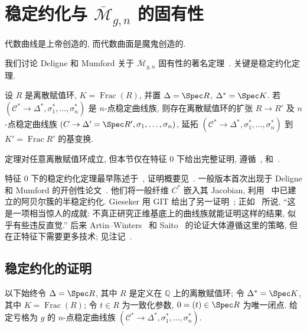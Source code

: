 \section{\texorpdfstring{稳定约化与 $\overline{\mathcal M}_{g,\allowbreak n}$ 的固有性}{稳定约化与 稳定曲线模叠 的固有性}}\label{src:6.5}
\begin{epigraph}
代数曲线是上帝创造的, 而代数曲面是魔鬼创造的.
\end{epigraph}
我们讨论 Deligne 和 Mumford 关于 $\overline{\mathcal M}_{g,\allowbreak n}$ 固有性的著名定理~\cite{DM69}. 关键是稳定约化定理.
\begin{theorem}[稳定约化]\label{src:6.5.1}
设 $R$ 是离散赋值环, $K=\operatorname{Frac}(R)$, 并置 $\Delta=\Spec R$, $\Delta^*=\Spec K$. 若 $(\mathcal C^*\to\Delta^*,\allowbreak \sigma_1^*,\allowbreak \ldots,\allowbreak \sigma_n^*)$ 是 $n$-点稳定曲线族, 则存在离散赋值环的扩张 $R\to\allowbreak R'$ 及 $n$-点稳定曲线族 $(\mathcal C\to\Delta'=\Spec R',\allowbreak \sigma_1,\allowbreak \ldots,\allowbreak \sigma_n)$, 延拓 $(\mathcal C^*\to\Delta^*,\allowbreak \sigma_1^*,\allowbreak \ldots,\allowbreak \sigma_n^*)$ 到 $K'=\operatorname{Frac}R'$ 的基变换.
\end{theorem}
定理对任意离散赋值环成立, 但本节仅在特征 $0$ 下给出完整证明, 遵循~\cite[第 II 章]{KKMS73}, \cite[\S3.C]{HM98} 和~\cite[\S X.4]{ACG11}.
\begin{remark}\label{src:6.5.2}
特征 $0$ 下的稳定约化定理最早陈述于~\cite[引理 A]{MM64b}, 证明概要见~\cite{May69}. 一般版本首次出现于 Deligne 和 Mumford 的开创性论文~\cite{DM69}. 他们将一般纤维 $C^*$ 嵌入其 Jacobian, 利用~\cite{SGA7-I,SGA7-II} 中已建立的阿贝尔簇的半稳定约化. Gieseker 用 GIT 给出了另一证明~\cite{Gie82}; 正如~\cite[Tag 0C2Q]{SP} 所说, ``这是一项相当惊人的成就: 不真正研究正维基底上的曲线族就能证明这样的结果, 似乎有些违反直觉.'' 后来 Artin--Winters~\cite{AW71} 和 Saito~\cite{Sai87} 的论证大体遵循这里的策略, 但在正特征下需要更多技术; 见注记~.
\end{remark}
\subsection{稳定约化的证明}\label{src:6.5.1-subsection}
以下始终令 $\Delta=\Spec R$, 其中 $R$ 是定义在 $\mathbb Q$ 上的离散赋值环; 令 $\Delta^*=\Spec K$, 其中 $K=\operatorname{Frac}(R)$; 令 $t\in R$ 为一致化参数, $0=(t)\in\Spec R$ 为唯一闭点. 给定亏格为 $g$ 的 $n$-点稳定曲线族 $(\mathcal C^*\to\Delta^*,\allowbreak \sigma_1^*,\allowbreak \ldots,\allowbreak \sigma_n^*)$.

